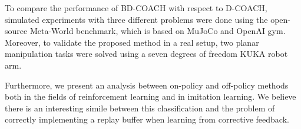 \vspace{3mm} %

To compare the performance of BD-COACH with respect to D-COACH, simulated experiments with three different problems were done using the open-source Meta-World benchmark, which is based on MuJoCo and OpenAI gym. Moreover, to validate the proposed method in a real setup, two planar manipulation tasks were solved using a seven degrees of freedom KUKA robot arm. 

\vspace{3mm} %


Furthermore, we present an analysis between on-policy and off-policy methods both in the fields of reinforcement learning and in imitation learning. We believe there is an interesting simile between this classification and the problem of correctly implementing a replay buffer when learning from corrective feedback.
